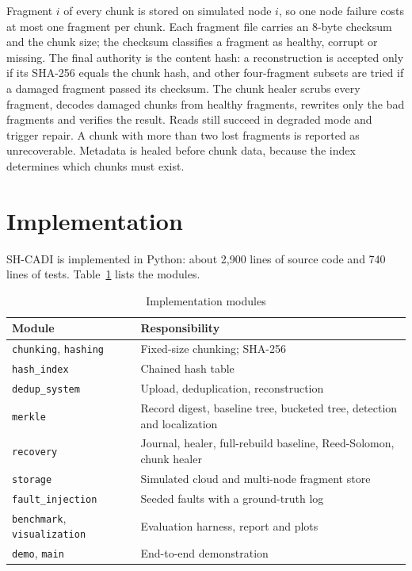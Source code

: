 \documentclass[conference]{IEEEtran}
\newcommand{\code}[1]{\texttt{#1}}
\begin{document}
Fragment $i$ of every chunk is stored on simulated node $i$, so one node failure costs at most one fragment per chunk. Each fragment file carries an 8-byte checksum and the chunk size; the checksum classifies a fragment as healthy, corrupt or missing. The final authority is the content hash: a reconstruction is accepted only if its SHA-256 equals the chunk hash, and other four-fragment subsets are tried if a damaged fragment passed its checksum. The chunk healer scrubs every fragment, decodes damaged chunks from healthy fragments, rewrites only the bad fragments and verifies the result. Reads still succeed in degraded mode and trigger repair. A chunk with more than two lost fragments is reported as unrecoverable. Metadata is healed before chunk data, because the index determines which chunks must exist.

\section{Implementation}
\label{sec:impl}

SH-CADI is implemented in Python: about 2,900 lines of source code and 740 lines of tests. Table~\ref{tab:modules} lists the modules.

\begin{table}[t]
\centering
\caption{Implementation modules}
\label{tab:modules}
\footnotesize
\begin{tabular}{@{}p{}p{}@{}}
\toprule
Module & Responsibility \\
\midrule
\code{chunking}, \code{hashing} & Fixed-size chunking; SHA-256 \\
\code{hash\_index} & Chained hash table \\
\code{dedup\_system} & Upload, deduplication, reconstruction \\
\code{merkle} & Record digest, baseline tree, bucketed tree, detection and localization \\
\code{recovery} & Journal, healer, full-rebuild baseline, Reed-Solomon, chunk healer \\
\code{storage} & Simulated cloud and multi-node fragment store \\
\code{fault\_injection} & Seeded faults with a ground-truth log \\
\code{benchmark}, \code{visualization} & Evaluation harness, report and plots \\
\code{demo}, \code{main} & End-to-end demonstration \\
\bottomrule
\end{tabular}
\end{table}
\end{document}
